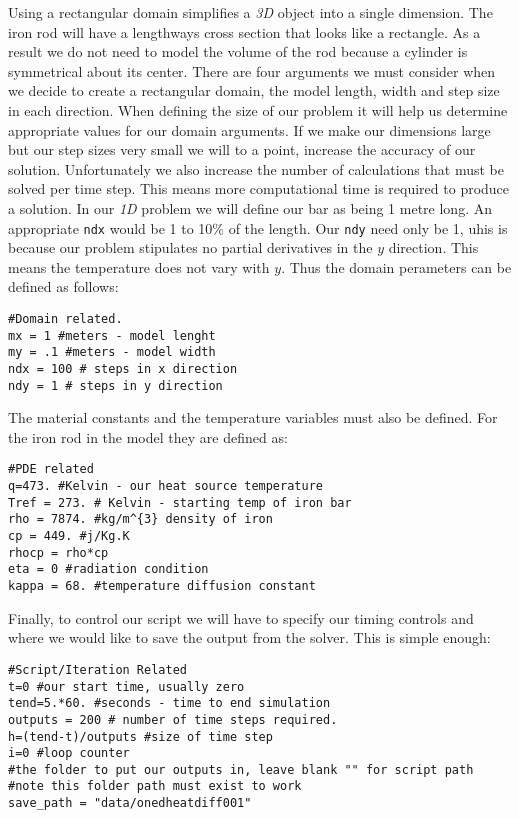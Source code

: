 Using a rectangular domain simplifies a \textit{3D} object into a single dimension. The iron rod will have a lengthways cross section that looks like a rectangle.  As a result we do not need to model the volume of the rod because a cylinder is symmetrical about its center. There are four arguments we must consider when we decide to create a rectangular domain, the model length, width and step size in each direction. When defining the size of our problem it will help us determine appropriate values for our domain arguments. If we make our dimensions large but our step sizes very small we will to a point, increase the accuracy of our solution. Unfortunately we also increase the number of calculations that must be solved per time step. This means more computational time is required to produce a solution. In our \textit{1D} problem we will define our bar as being 1 metre long. An appropriate \verb|ndx| would be 1 to 10\% of the length. Our \verb|ndy| need only be 1, uhis is because our problem stipulates no partial derivatives in the $y$ direction. This means the temperature does not vary with $y$. Thus the domain perameters can be defined as follows:
\begin{verbatim}
#Domain related.
mx = 1 #meters - model lenght
my = .1 #meters - model width
ndx = 100 # steps in x direction 
ndy = 1 # steps in y direction
\end{verbatim}
The material constants and the temperature variables must also be defined. For the iron rod in the model they are defined as:
\begin{verbatim}
#PDE related
q=473. #Kelvin - our heat source temperature
Tref = 273. # Kelvin - starting temp of iron bar
rho = 7874. #kg/m^{3} density of iron
cp = 449. #j/Kg.K
rhocp = rho*cp
eta = 0 #radiation condition
kappa = 68. #temperature diffusion constant
\end{verbatim}
Finally, to control our script we will have to specify our timing controls and where we would like to save the output from the solver. This is simple enough:
\begin{verbatim}
#Script/Iteration Related
t=0 #our start time, usually zero
tend=5.*60. #seconds - time to end simulation
outputs = 200 # number of time steps required.
h=(tend-t)/outputs #size of time step
i=0 #loop counter 
#the folder to put our outputs in, leave blank "" for script path
#note this folder path must exist to work
save_path = "data/onedheatdiff001" 
\end{verbatim}
